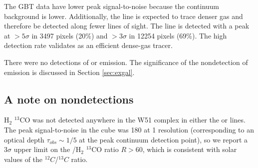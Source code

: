 The GBT \formaldehyde \twotwo data have lower peak signal-to-noise because the
continuum background is lower.  Additionally, the \twotwo line is expected to
trace denser gas and therefore be detected along fewer lines of sight.  The
\twotwo line is detected with a peak at $>5\sigma$ in 3497 pixels (20\%) and
$>3\sigma$ in 12254 pixels (69\%).  The high detection rate validates
\formaldehyde as an efficient dense-gas tracer.

There were no detections of \formaldehyde \oneone or \twotwo emission.  The
significance of the nondetection of emission is discussed in Section
\ref{sec:exgal}.

% 


\subsection{A note on nondetections}
H$_2$ $^{13}$CO was not detected anywhere in the W51 complex in either the
\oneone or \twotwo lines.  The peak signal-to-noise in the \formaldehyde \oneone cube was
180 at 1 \kms resolution (corresponding to an optical depth $\tau_{obs}\sim1/5$ at
the peak continuum detection point), so we report a $3\sigma$ upper limit on the
\formaldehyde/H$_2$ $^{13}$CO ratio $R>60$, which is consistent with solar
values of the $^{12}C$/$^{13}C$
ratio.

